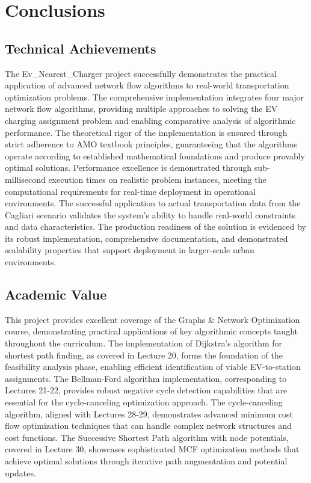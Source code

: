 \documentclass[12pt,a4paper]{article}
\begin{document}
\section{Conclusions}

\subsection{Technical Achievements}

The Ev\_Nearest\_Charger project successfully demonstrates the practical application of advanced network flow algorithms to real-world transportation optimization problems. The comprehensive implementation integrates four major network flow algorithms, providing multiple approaches to solving the EV charging assignment problem and enabling comparative analysis of algorithmic performance. The theoretical rigor of the implementation is ensured through strict adherence to AMO textbook principles, guaranteeing that the algorithms operate according to established mathematical foundations and produce provably optimal solutions. Performance excellence is demonstrated through sub-millisecond execution times on realistic problem instances, meeting the computational requirements for real-time deployment in operational environments. The successful application to actual transportation data from the Cagliari scenario validates the system's ability to handle real-world constraints and data characteristics. The production readiness of the solution is evidenced by its robust implementation, comprehensive documentation, and demonstrated scalability properties that support deployment in larger-scale urban environments.

\subsection{Academic Value}

This project provides excellent coverage of the Graphs \& Network Optimization course, demonstrating practical applications of key algorithmic concepts taught throughout the curriculum. The implementation of Dijkstra's algorithm for shortest path finding, as covered in Lecture 20, forms the foundation of the feasibility analysis phase, enabling efficient identification of viable EV-to-station assignments. The Bellman-Ford algorithm implementation, corresponding to Lectures 21-22, provides robust negative cycle detection capabilities that are essential for the cycle-canceling optimization approach. The cycle-canceling algorithm, aligned with Lectures 28-29, demonstrates advanced minimum cost flow optimization techniques that can handle complex network structures and cost functions. The Successive Shortest Path algorithm with node potentials, covered in Lecture 30, showcases sophisticated MCF optimization methods that achieve optimal solutions through iterative path augmentation and potential updates.
\end{document}
